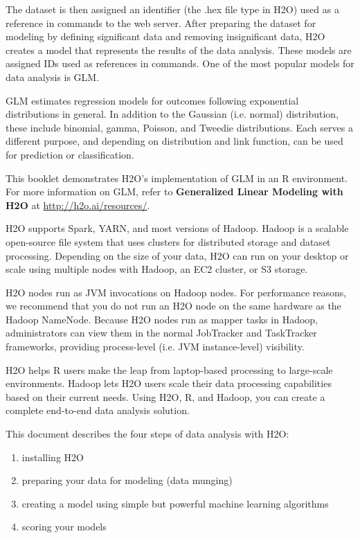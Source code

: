 {The dataset is then assigned an identifier (the .hex file type in H2O) used as a reference in  commands to the web server. After preparing the dataset for modeling by defining significant data and removing insignificant data, H2O creates a model that represents the results of the data analysis. These models are assigned IDs used as references in commands. One of the most popular models for data analysis is GLM.

GLM estimates regression models for outcomes following exponential distributions in general. In addition to the Gaussian (i.e. normal) distribution, these include binomial, gamma, Poisson, and Tweedie distributions. Each serves a different purpose, and depending on distribution and link function, can be used for prediction or classification.

This booklet demonstrates H2O's implementation of GLM in an R environment. For more information on GLM, refer to \textbf{Generalized Linear Modeling with H2O} at {\url{http://h2o.ai/resources/}}.

H2O supports Spark, YARN, and most versions of Hadoop. Hadoop is a scalable open-source file system that uses clusters for distributed storage and dataset processing. Depending on the size of your data, H2O can run on your desktop or scale using multiple nodes with Hadoop, an EC2 cluster, or S3 storage.

H2O nodes run as JVM invocations on Hadoop nodes. For performance reasons, we recommend that you do not run an H2O node on the same hardware as the Hadoop NameNode. Because H2O nodes run as mapper tasks in Hadoop, administrators can view them in the normal JobTracker and TaskTracker frameworks, providing process-level (i.e. JVM instance-level) visibility.

H2O helps R users make the leap from laptop-based processing to large-scale environments. Hadoop lets H2O users scale their data processing capabilities based on their current needs. Using H2O, R, and Hadoop, you can create a complete end-to-end data analysis solution.

This document describes the four steps of data analysis with H2O:
\begin{enumerate}

\item installing H2O
\item preparing your data for modeling (data munging)
\item creating a model using simple but powerful machine learning algorithms
\item scoring your models


\end{enumerate}}
